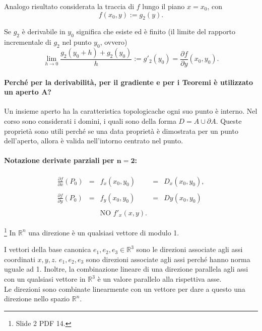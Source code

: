 Analogo risultato considerata la traccia di $f$ lungo il piano $x=x_0$, con
\begin{equation*}
	f(x_0,y):=g_2(y).
\end{equation*}

Se $g_2$ è derivabile in $y_0$ significa che esiste ed è finito (il limite del rapporto incrementale di $g_2$ nel punto $y_0$, ovvero)
\begin{equation*}
	\lim\limits_{h\rightarrow 0}\frac{g_2(y_0+h)+g_2(y_0)}{h}:=g'_2(y_0)=\frac{\partial f}{\partial y}(x_0,y_0).
\end{equation*}

\paragraph{Perché per la derivabilità, per il gradiente e per i Teoremi è utilizzato un aperto $\boldsymbol{A}$?} Un insieme aperto ha la caratteristica topologicache ogni suo punto è interno. Nel corso sono considerati i domini, i quali sono della forma $D= A\cup\partial A$. Queste proprietà sono utili perché se una data proprietà è dimostrata per un punto dell'aperto, allora è valida nell'intorno centrato nel punto.

\paragraph{Notazione derivate parziali per $\boldsymbol{n=2}$:}
\begin{equation*}
	\begin{matrix}
		\frac{\partial f}{\partial x}(P_0)&=&f_x(x_0,y_0)&=& D_x(x_0,y_0),\\\\
		\frac{\partial f}{\partial y}(P_0) &=& f_y(x_0,y_0) &=& Dy(x_0,y_0)\\\\
		&&\text{NO } f'_x(x,y).&&
	\end{matrix}
\end{equation*}

\begin{definition}[Direzione]\footnote{Slide 2 PDF 14.}
    In $\mathbb R^n$ una direzione è un qualsiasi vettore di modulo 1.
\end{definition}
I vettori della base canonica $e_1,e_2,e_3\in\mathbb R^3$ sono le direzioni associate agli assi coordinati $x,y,z$. $e_1,e_2,e_3$ sono direzioni associate agli assi perché hanno norma uguale ad 1. Inoltre, la combinazione lineare di una direzione parallela agli assi con un qualsiasi vettore in $\mathbb R^3$ è un valore parallelo alla rispettiva asse.\\
Le direzioni sono combinate linearmente con un vettore per dare a questo una direzione nello spazio $\mathbb R^n$.

